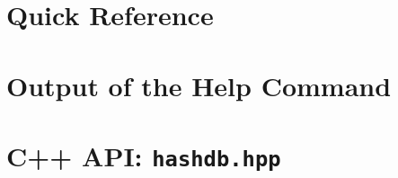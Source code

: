 \documentclass[11pt,fleqn]{article} %
\begin{document}
\newpage
\appendix
\appendixpage

\section{\hdb Quick Reference}
\label{QuickReference}

\newpage

\section{Output of the \hdb Help Command}
\label{HelpOutput}
\begingroup
\footnotesize
{
\selectfont

}
\endgroup


\section{\hdb C++ API: \texttt{hashdb.hpp}}
\label{hashdbapi}
\lstset{language=C++}
\lstset{basicstyle=\footnotesize}
\lstset{breaklines=true}
\lstset{breakatwhitespace=true}

\end{document}
